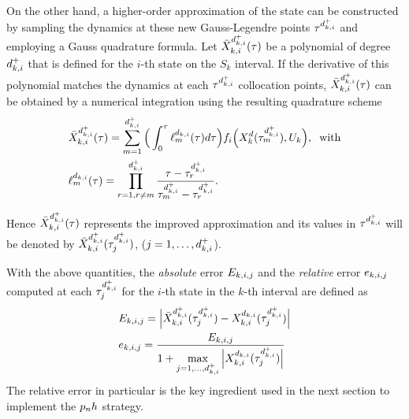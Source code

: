 On the other hand, a higher-order approximation of the state can be constructed by sampling the dynamics at these new Gauss-Legendre points $\tau^{{d}_{k,i}^{+}}$ and employing a Gauss quadrature formula.
Let $\bar{X}_{k,i}^{d_{k,i}^{+}} (\tau)$ be a polynomial of degree $d_{k,i}^{+}$ that is defined for the $i$-th state on the $S_k$ interval. If the derivative of this polynomial matches the dynamics at each $\tau^{{d}_{k,i}^{+}}$ collocation points, $\bar{X}_{k,i}^{d_{k,i}^{+}} (\tau)$ can be obtained by a numerical integration using the resulting quadrature scheme
\begin{subequations}
\begin{align}
	&\bar{X}_{k,i}^{d_{k,i}^{+}} (\tau) = \sum_{m=1}^{d_{k,i}^{+}}\Big(\int_{0}^{\tau}\ell_{m}^{d_{k,i}} (\tau)d\tau\Big) f_i\Big(X_{k}^{d}(\tau^{{d}_{k,i}^{+}}_m), U_k\Big), \hspace{2mm} \text{with} \label{eq:barX}\\
	&  \ell_{m}^{d_{k,i}} (\tau) = \prod_{r=1, r\neq m}^{d_{k,i}^{+}} \dfrac{\tau - \tau^{{d}_{k,i}^{+}}_r}{\tau^{{d}_{k,i}^{+}}_m - \tau^{{d}_{k,i}^{+}}_r}. \label{eq:meshlm}
\end{align}
\end{subequations}

Hence $\bar{X}_{k,i}^{d_{k,i}^{+}} (\tau)$ represents the improved approximation and its values in $\tau^{{d}_{k,i}^{+}}$ will be denoted by $\bar{X}_{k,i}^{d_{k,i}^{+}} (\tau^{{d}_{k,i}^{+}}_j)$, ($j = 1, \dots, d_{k,i}^{+}$).

With the above quantities, the \emph{absolute} error $E_{k,i,j}$ and the \emph{relative} error $e_{k,i,j}$ computed at each $\tau^{{d}_{k,i}^{+}}_j$ for the $i$-th state in the $k$-th interval are defined as
\begin{subequations}
	\begin{align}
	&E_{k,i,j} = \Big|\bar{X}_{k,i}^{d_{k,i}^{+}} (\tau^{{d}_{k,i}^{+}}_j) - X_{k,i}^{d_{k,i}} (\tau^{{d}_{k,i}^{+}}_j)\Big| \label{eq:absolute}\\
	&e_{k,i,j} = \dfrac{E_{k,i,j}}{1 + \max\limits_{j= 1, \dots, d_{k,i}^{+}} \Big| X_{k,i}^{d_{k,i}} (\tau^{{d}_{k,i}^{+}}_j)\Big|} \label{eq:relative}
	\end{align}
\end{subequations}
The relative error in particular is the key ingredient used  in the next section to implement the $p_{n}h$ strategy.

